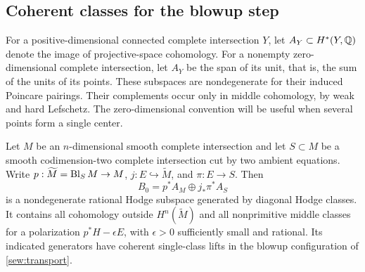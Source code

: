 \subsection{Coherent classes for the blowup step}

For a positive-dimensional connected complete intersection $Y$, let
$A_Y\subset H^*(Y,\mathbb Q)$ denote the image of projective-space cohomology.
For a nonempty zero-dimensional complete intersection, let $A_Y$ be
the span of its unit, that is, the sum of the units of its points.
These subspaces are nondegenerate for their induced Poincare pairings.
Their complements occur only in middle cohomology, by weak and hard
Lefschetz. The zero-dimensional convention will be useful when several
points form a single center.

\begin{lemma}
\label{ind:blowup-data}
Let $M$ be an $n$-dimensional smooth complete intersection and let
$S\subset M$ be a smooth codimension-two complete intersection cut by
two ambient equations. Write $p:\widetilde M=\operatorname{Bl}_S M\to M$,
$j:E\hookrightarrow\widetilde M$, and $\pi:E\to S$. Then
\begin{equation}
\label{ind:blowup-B0}
 B_0=p^*A_M\oplus j_*\pi^*A_S
\end{equation}
is a nondegenerate rational Hodge subspace generated by diagonal Hodge
classes. It contains all cohomology outside $H^n(\widetilde M)$ and
all nonprimitive middle classes for a polarization
$p^*H-\epsilon E$, with $\epsilon>0$ sufficiently small and rational.
Its indicated generators have coherent single-class lifts in the
blowup configuration of \cref{sew:transport}.
\end{lemma}

